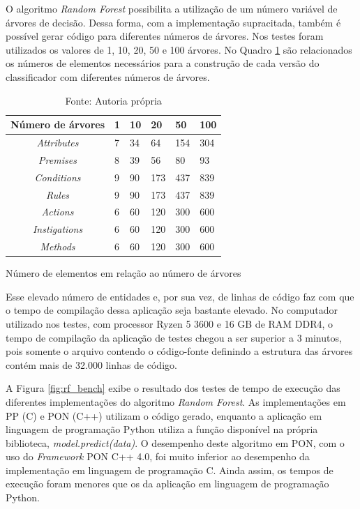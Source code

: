 O algoritmo \textit{Random Forest} possibilita a utilização de um número
variável de árvores de decisão. Dessa forma, com a implementação supracitada,
também é possível gerar código para diferentes números de árvores. Nos testes
foram utilizados os valores de 1, 10, 20, 50 e 100 árvores. No Quadro
\ref{tab:elementos_arvores} são relacionados os números de elementos necessários
para a construção de cada versão do classificador com diferentes números de
árvores.

\begin{table}[!htb]
\centering
\label{tab:elementos_arvores}
\smallskip
\begin{tabularx}{0.8\textwidth}{|c|X|X|X|X|X|}
\hline
\textbf{Número de árvores} & 1 & 10 & 20 & 50 & 100\\
\hline
\hline
\textit{Attributes} & 7 & 34 & 64 & 154 & 304 \\
\hline
\textit{Premises} & 8 & 39 & 56 & 80 & 93 \\
\hline
\textit{Conditions} & 9 & 90 & 173 & 437 & 839 \\
\hline
\textit{Rules} & 9 & 90 & 173 & 437 & 839 \\
\hline
\textit{Actions} & 6 & 60 & 120 & 300 & 600 \\
\hline
\textit{Instigations} & 6 & 60 & 120 & 300 & 600 \\
\hline
\textit{Methods} & 6 & 60 & 120 & 300 & 600 \\
\hline
\end{tabularx}
\caption{Número de elementos em relação ao número de árvores}
\caption*{Fonte: Autoria própria}
\end{table}

Esse elevado número de entidades e, por sua vez, de linhas de código faz com que
o tempo de compilação dessa aplicação seja bastante elevado. No computador
utilizado nos testes, com processor Ryzen 5 3600 e 16 GB de RAM DDR4, o tempo de
compilação da aplicação de testes chegou a ser superior a 3 minutos, pois
somente o arquivo contendo o código-fonte definindo a estrutura das árvores
contém mais de 32.000 linhas de código.

A Figura \ref{fig:rf_bench} exibe o resultado dos testes de tempo de execução
das diferentes implementações do algoritmo \textit{Random Forest}. As
implementações em PP (C) e PON (C++) utilizam o código gerado, enquanto a
aplicação em linguagem de programação Python utiliza a função disponível na
própria biblioteca, \textit{model.predict(data)}. O desempenho deste algoritmo
em PON, com o uso do \textit{Framework} PON C++ 4.0, foi muito inferior ao
desempenho da implementação em linguagem de programação C. Ainda assim, os
tempos de execução foram menores que os da aplicação em linguagem de programação
Python.

